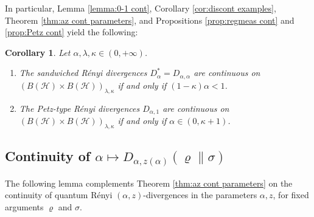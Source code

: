 \documentclass[unsortedaddress,superscriptaddress,pra,notitlepage]{revtex4}
\newtheorem{cor}[definition]{Corollary}
\def\rho{\varrho}
\def\cH{\mathcal{H}}
\def\pwr{\kappa}
\begin{document}
In particular, Lemma \ref{lemma:0-1 cont}, 
Corollary \ref{cor:discont examples},
Theorem \ref{thm:az cont parameters}, and 
Propositions \ref{prop:regmeas cont} and \ref{prop:Petz cont} yield the following:

\begin{cor}\label{cor:sand Petz cont}
Let $\alpha,\lambda,\pwr\in(0,+\infty)$.
\begin{enumerate}
\item
The sandwiched R\'enyi divergences
$D_\alpha^*=D_{\alpha,\alpha}$ 
are continuous on 
$(B(\cH)\times B(\cH))_{\lambda,\pwr}$ if and only if 
$(1-\pwr)\alpha<1$.

\item
The Petz-type R\'enyi divergences
$D_{\alpha,1}$ are continuous
on $(B(\cH)\times B(\cH))_{\lambda,\pwr}$
if and only if $\alpha\in(0,\pwr+1)$.
\end{enumerate}
\end{cor}


\subsection{Continuity of $\alpha\mapsto D_{\alpha,z(\alpha)}(\rho\|\sigma)$}
\label{sec:path cont}

The following lemma complements Theorem \ref{thm:az cont parameters} on
the continuity of quantum R\'enyi $(\alpha,z)$-divergences in the parameters $\alpha,z$,
for fixed arguments $\rho$ and $\sigma$.
\end{document}
